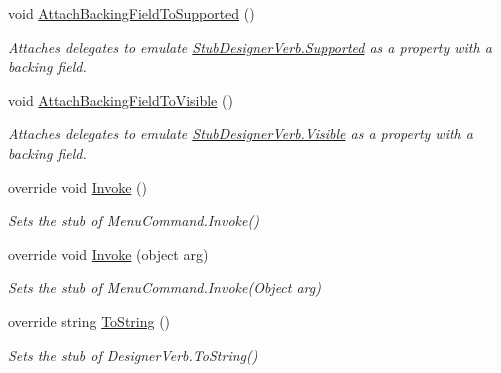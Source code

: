 \begin{DoxyCompactItemize}
void \hyperlink{class_system_1_1_component_model_1_1_design_1_1_fakes_1_1_stub_designer_verb_a3dd7062f74529babe1138fd6e1c2b617}{Attach\-Backing\-Field\-To\-Supported} ()
\begin{DoxyCompactList}\small\item\em Attaches delegates to emulate \hyperlink{class_system_1_1_component_model_1_1_design_1_1_fakes_1_1_stub_designer_verb_aea3ce5fd794e8dd37cfdcfcc61d5028a}{Stub\-Designer\-Verb.\-Supported} as a property with a backing field.\end{DoxyCompactList}\item 
void \hyperlink{class_system_1_1_component_model_1_1_design_1_1_fakes_1_1_stub_designer_verb_a07a15431935487238bb70203726702e4}{Attach\-Backing\-Field\-To\-Visible} ()
\begin{DoxyCompactList}\small\item\em Attaches delegates to emulate \hyperlink{class_system_1_1_component_model_1_1_design_1_1_fakes_1_1_stub_designer_verb_a681a5dee750b417a92dcedb8d2d46900}{Stub\-Designer\-Verb.\-Visible} as a property with a backing field.\end{DoxyCompactList}\item 
override void \hyperlink{class_system_1_1_component_model_1_1_design_1_1_fakes_1_1_stub_designer_verb_a084d4b3974226d0e0d2b9a1b14ea4a7c}{Invoke} ()
\begin{DoxyCompactList}\small\item\em Sets the stub of Menu\-Command.\-Invoke()\end{DoxyCompactList}\item 
override void \hyperlink{class_system_1_1_component_model_1_1_design_1_1_fakes_1_1_stub_designer_verb_ac08fbddeb3049f0a3141ff954d294a8d}{Invoke} (object arg)
\begin{DoxyCompactList}\small\item\em Sets the stub of Menu\-Command.\-Invoke(\-Object arg)\end{DoxyCompactList}\item 
override string \hyperlink{class_system_1_1_component_model_1_1_design_1_1_fakes_1_1_stub_designer_verb_a805de795328e597bc55c1bedb05690b2}{To\-String} ()
\begin{DoxyCompactList}\small\item\em Sets the stub of Designer\-Verb.\-To\-String()\end{DoxyCompactList}\end{DoxyCompactItemize}
